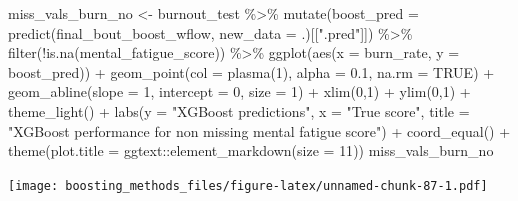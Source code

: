 \documentclass[
]{book}
\newenvironment{Shaded}{\begin{snugshade}}{\end{snugshade}}
\newcommand{\AttributeTok}[1]{\textcolor[rgb]{0.77,0.63,0.00}{#1}}
\newcommand{\ConstantTok}[1]{\textcolor[rgb]{0.00,0.00,0.00}{#1}}
\newcommand{\DecValTok}[1]{\textcolor[rgb]{0.00,0.00,0.81}{#1}}
\newcommand{\FloatTok}[1]{\textcolor[rgb]{0.00,0.00,0.81}{#1}}
\newcommand{\FunctionTok}[1]{\textcolor[rgb]{0.00,0.00,0.00}{#1}}
\newcommand{\NormalTok}[1]{#1}
\newcommand{\OtherTok}[1]{\textcolor[rgb]{0.56,0.35,0.01}{#1}}
\newcommand{\SpecialCharTok}[1]{\textcolor[rgb]{0.00,0.00,0.00}{#1}}
\newcommand{\StringTok}[1]{\textcolor[rgb]{0.31,0.60,0.02}{#1}}
\begin{document}
\begin{Shaded}
\begin{Highlighting}[]
\NormalTok{miss\_vals\_burn\_no }\OtherTok{\textless{}{-}}\NormalTok{ burnout\_test }\SpecialCharTok{\%\textgreater{}\%}
  \FunctionTok{mutate}\NormalTok{(}\AttributeTok{boost\_pred =} \FunctionTok{predict}\NormalTok{(final\_bout\_boost\_wflow,}
                              \AttributeTok{new\_data =}\NormalTok{ .)[[}\StringTok{".pred"}\NormalTok{]]) }\SpecialCharTok{\%\textgreater{}\%}
  \FunctionTok{filter}\NormalTok{(}\SpecialCharTok{!}\FunctionTok{is.na}\NormalTok{(mental\_fatigue\_score)) }\SpecialCharTok{\%\textgreater{}\%}
  \FunctionTok{ggplot}\NormalTok{(}\FunctionTok{aes}\NormalTok{(}\AttributeTok{x =}\NormalTok{ burn\_rate, }\AttributeTok{y =}\NormalTok{ boost\_pred)) }\SpecialCharTok{+}
  \FunctionTok{geom\_point}\NormalTok{(}\AttributeTok{col =} \FunctionTok{plasma}\NormalTok{(}\DecValTok{1}\NormalTok{), }\AttributeTok{alpha =} \FloatTok{0.1}\NormalTok{, }\AttributeTok{na.rm =} \ConstantTok{TRUE}\NormalTok{) }\SpecialCharTok{+} 
  \FunctionTok{geom\_abline}\NormalTok{(}\AttributeTok{slope =} \DecValTok{1}\NormalTok{, }\AttributeTok{intercept =} \DecValTok{0}\NormalTok{, }\AttributeTok{size =} \DecValTok{1}\NormalTok{) }\SpecialCharTok{+}
  \FunctionTok{xlim}\NormalTok{(}\DecValTok{0}\NormalTok{,}\DecValTok{1}\NormalTok{) }\SpecialCharTok{+} \FunctionTok{ylim}\NormalTok{(}\DecValTok{0}\NormalTok{,}\DecValTok{1}\NormalTok{) }\SpecialCharTok{+}
  \FunctionTok{theme\_light}\NormalTok{() }\SpecialCharTok{+}
  \FunctionTok{labs}\NormalTok{(}\AttributeTok{y =} \StringTok{"XGBoost predictions"}\NormalTok{,}
       \AttributeTok{x =} \StringTok{"True score"}\NormalTok{,}
       \AttributeTok{title =} \StringTok{"XGBoost performance for non missing mental fatigue score"}\NormalTok{) }\SpecialCharTok{+}
  \FunctionTok{coord\_equal}\NormalTok{() }\SpecialCharTok{+}
  \FunctionTok{theme}\NormalTok{(}\AttributeTok{plot.title =}\NormalTok{ ggtext}\SpecialCharTok{::}\FunctionTok{element\_markdown}\NormalTok{(}\AttributeTok{size =} \DecValTok{11}\NormalTok{))}
\NormalTok{miss\_vals\_burn\_no}
\end{Highlighting}
\end{Shaded}

\texttt{[image: boosting\_methods\_files/figure-latex/unnamed-chunk-87-1.pdf]}
\end{document}
